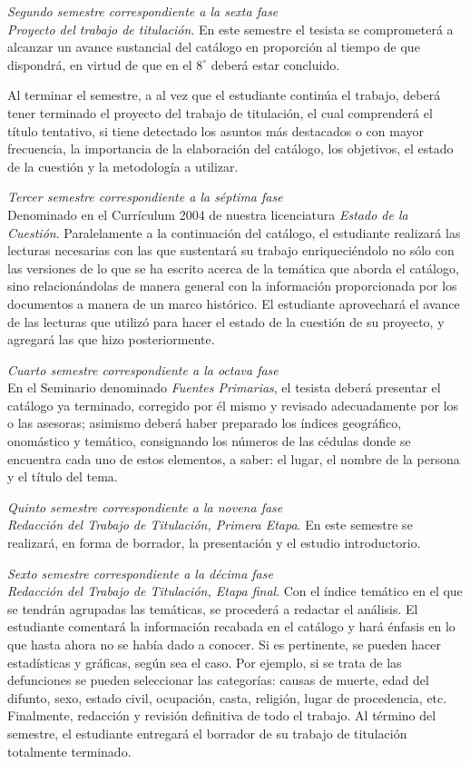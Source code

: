\noindent \textsl{Segundo semestre correspondiente a la 
sexta fase}\\ \textit{Proyecto del trabajo de titulación}. En este 
semestre el tesista se comprometerá a alcanzar un avance sustancial del catálogo en 
proporción al tiempo de que dispondrá, en virtud de que en el $8^\circ$ 
deberá estar concluido.

Al terminar el semestre, a al vez que el estudiante continúa el trabajo, 
deberá tener terminado el proyecto del trabajo de titulación, el cual  
comprenderá el título tentativo, si tiene detectado los asuntos más 
destacados o con mayor frecuencia, la importancia de la elaboración del 
catálogo, los objetivos, el estado de la cuestión y la metodología a 
utilizar.
 
\noindent \textsl{Tercer semestre correspondiente a la 
séptima fase}\\ Denominado en el Currículum 2004 de nuestra licenciatura 
\textit{Estado de la Cuestión}. Paralelamente a la continuación del 
catálogo, el estudiante realizará las lecturas necesarias con las que 
sustentará su trabajo enriqueciéndolo no sólo con las versiones de lo 
que se ha escrito acerca de la temática que aborda el catálogo, sino 
relacionándolas de manera general con la información proporcionada por 
los documentos a manera de un marco histórico. El estudiante 
aprovechará el avance de las lecturas que utilizó para hacer el estado 
de la cuestión de su proyecto, y agregará las que hizo posteriormente.

\smallskip 
\noindent \textsl{Cuarto semestre correspondiente a la 
octava fase}\\ En el Seminario denominado \textit{Fuentes Primarias}, el 
tesista deberá presentar el catálogo ya terminado, corregido por él mismo 
y revisado adecuadamente por los o las asesoras;  asimismo deberá haber preparado los 
índices geográfico, onomástico y temático, consignando los números de 
las cédulas donde se encuentra cada uno de estos elementos, a saber: el 
lugar, el nombre de la persona y el título del tema. 

\noindent  \textsl{Quinto semestre correspondiente a la 
novena fase}\\ \textit{Redacción del Trabajo de Titulación, Primera 
Etapa}. En este semestre se realizará, en forma de borrador, la 
presentación y el estudio introductorio.
 
\noindent \textsl{Sexto semestre correspondiente a la décima fase}\\ 
\textit{Redacción del Trabajo de Titulación, Etapa final}. Con 
el índice temático en el que se  tendrán agrupadas las temáticas, se 
procederá a redactar el análisis. El estudiante comentará la 
información recabada en el catálogo y hará énfasis en lo que hasta 
ahora no se había dado a conocer. Si es pertinente, se pueden hacer 
estadísticas y gráficas, según sea el caso. Por ejemplo, si se trata de 
las defunciones se pueden seleccionar las categorías: causas de muerte, 
edad del difunto, sexo, estado civil, ocupación, casta, religión, lugar 
de procedencia, etc. Finalmente, redacción y revisión definitiva de 
todo el trabajo. Al término del semestre, el estudiante entregará el 
borrador de su trabajo de titulación totalmente terminado.


